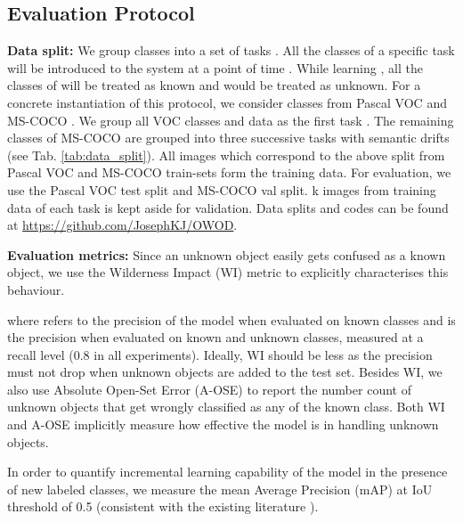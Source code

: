 \documentclass[final]{cvpr}
\begin{document}
\subsection{\OW Evaluation Protocol} \label{sec:evaluation_protocol}
\noindent \textbf{Data split:} We group classes into a set of tasks . All the classes of a specific task will be introduced to the system at a point of time . While learning , all the classes of  will be treated as known and   would be treated as unknown. For a concrete instantiation of this protocol, we consider classes from Pascal VOC \cite{everingham2010pascal} and MS-COCO \cite{lin2014microsoft}. We group all VOC classes and data as the first task . The remaining  classes of MS-COCO \cite{lin2014microsoft} are grouped into three successive tasks with semantic drifts (see Tab. \ref{tab:data_split}). 
All images  which correspond to the above split from  Pascal VOC and MS-COCO train-sets form the training data. 
For evaluation, we use the Pascal VOC test split and MS-COCO val split. k images from training data of each task is kept aside for validation.
Data splits and codes can be found at {\small\url{https://github.com/JosephKJ/OWOD}}.

\noindent \textbf{Evaluation metrics:} 
Since an unknown object easily gets confused as a known object, we use the Wilderness Impact (WI) metric \cite{dhamija2020overlooked} to explicitly characterises this behaviour.

where  refers to the precision of the model when evaluated on known classes and  is the precision when evaluated on known and unknown classes, measured at a recall level  (0.8 in all experiments). Ideally, WI should be less as the precision must not drop when unknown objects are added to the test set. Besides WI, we also use  Absolute Open-Set Error (A-OSE) \cite{miller2018dropout}
to report the number count of unknown objects that get wrongly classified as any of the known class. 
Both WI and A-OSE implicitly measure how effective the model is in handling unknown objects. 

In order to quantify incremental learning capability of the model in the presence of new labeled classes, we measure the mean Average Precision (mAP) at IoU threshold of 0.5 (consistent with the existing literature \cite{shmelkov2017incremental,PENG2020109}).  
\end{document}
